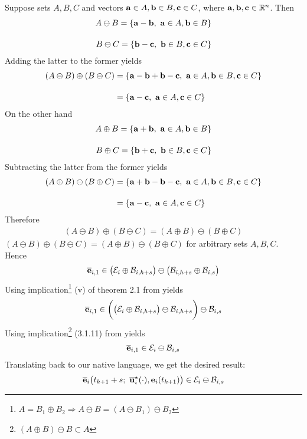 \begin{gg_box}
{  Suppose sets $A,B,C$ and vectors
  $\bm{\mathbf{a}} \in A, \bm{\mathbf{b}} \in B, \bm{\mathbf{c}} \in C$, where
  $\bm{\mathbf{a}}, \bm{\mathbf{b}}, \bm{\mathbf{c}} \in \mathbb{R}^n$. Then
\begin{align}
  A \ominus B = \{\bm{\mathbf{a}} - \bm{\mathbf{b}},\ \bm{\mathbf{a}} \in A, \bm{\mathbf{b}} \in B\} \\[2.5ex]
  B \ominus C = \{\bm{\mathbf{b}} - \bm{\mathbf{c}},\ \bm{\mathbf{b}} \in B, \bm{\mathbf{c}} \in C\}
\end{align}
Adding the latter to the former yields
\begin{align}
  (A \ominus B) \oplus (B \ominus C)
    &= \{\bm{\mathbf{a}} - \bm{\mathbf{b}} + \bm{\mathbf{b}} - \bm{\mathbf{c}},\ \bm{\mathbf{a}} \in A, \bm{\mathbf{b}} \in B, \bm{\mathbf{c}} \in C\} \\[2.5ex]
    &= \{\bm{\mathbf{a}} - \bm{\mathbf{c}},\ \bm{\mathbf{a}} \in A, \bm{\mathbf{c}} \in C\}
\end{align}
On the other hand
\begin{align}
  A \oplus B = \{\bm{\mathbf{a}} + \bm{\mathbf{b}},\ \bm{\mathbf{a}} \in A, \bm{\mathbf{b}} \in B\} \\[2.5ex]
  B \oplus C = \{\bm{\mathbf{b}} + \bm{\mathbf{c}},\ \bm{\mathbf{b}} \in B, \bm{\mathbf{c}} \in C\}
\end{align}
Subtracting the latter from the former yields
\begin{align}
  (A \oplus B) \ominus (B \oplus C) &= \{\bm{\mathbf{a}} + \bm{\mathbf{b}} - \bm{\mathbf{b}} - \bm{\mathbf{c}},\ \bm{\mathbf{a}} \in A, \bm{\mathbf{b}} \in B, \bm{\mathbf{c}} \in C\} \\[2.5ex]
    &= \{\bm{\mathbf{a}} - \bm{\mathbf{c}},\ \bm{\mathbf{a}} \in A, \bm{\mathbf{c}} \in C\}
\end{align}
Therefore
\begin{align}
  (A \ominus B) \oplus (B \ominus C) = (A \oplus B) \ominus (B \oplus C)
\end{align}
}
$(A \ominus B) \oplus (B \ominus C) = (A \oplus B) \ominus (B \oplus C)$
for arbitrary sets $A,B,C$. Hence
\begin{align}
  \overline{\bm{\mathbf{e}}}_{i,1} \in \big(\mathcal{E}_i \oplus \mathcal{B}_{i,h+s}\big) \ominus \big(\mathcal{B}_{i, h+s} \oplus \mathcal{B}_{i,s}\big)
\end{align}
Using implication\footnote{
$A = B_1 \oplus B_2 \Rightarrow A \ominus B = (A \ominus B_1) \ominus B_2$}
(v) of theorem 2.1 from \cite{kolmanovsky} yields
\begin{align}
  \overline{\bm{\mathbf{e}}}_{i,1} \in \bigg(\big(\mathcal{E}_i \oplus \mathcal{B}_{i,h+s}\big) \ominus \mathcal{B}_{i, h+s}\bigg) \ominus \mathcal{B}_{i,s}
\end{align}
Using implication\footnote{$(A \oplus B) \ominus B \subset A$}
(3.1.11) from \cite{schneider_2013} yields
\begin{align}
  \overline{\bm{\mathbf{e}}}_{i,1} \in \mathcal{E}_i \ominus \mathcal{B}_{i,s}
\end{align}
Translating back to our native language, we get the desired result:
\begin{align}
  \overline{\vect{e}}_i\big(t_{k+1} + s;\ \overline{\vect{u}}_i^{\star}(\cdot), \vect{e}_i(t_{k+1})\big) \in \mathcal{E}_i \ominus \mathcal{B}_{i,s}
\end{align}
\qedsymbol
\end{gg_box}

